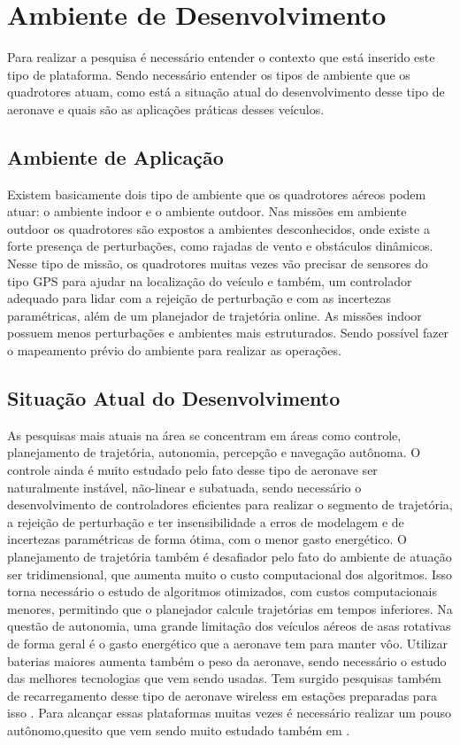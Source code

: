 \chapter{Ambiente de Desenvolvimento}
\label{chap:ambiente}

Para realizar a pesquisa é necessário entender o contexto que está inserido este tipo de plataforma. Sendo necessário entender os tipos de ambiente que os quadrotores atuam, como está a situação atual do desenvolvimento desse tipo de aeronave e quais são as aplicações práticas desses veículos.

\section{Ambiente de Aplicação}

Existem basicamente dois tipo de ambiente que os quadrotores aéreos podem atuar: o ambiente indoor e o ambiente outdoor. Nas missões em ambiente outdoor os quadrotores são expostos a ambientes desconhecidos, onde existe a forte presença de perturbações, como rajadas de vento e obstáculos dinâmicos. Nesse tipo de missão, os quadrotores muitas vezes vão precisar de sensores do tipo GPS para ajudar na localização do veículo e também, um controlador adequado para lidar com a rejeição de perturbação e com as incertezas paramétricas, além de um planejador de trajetória online. As missões indoor possuem menos perturbações e ambientes mais estruturados. Sendo possível fazer o mapeamento prévio do ambiente para realizar as operações.

\section{Situação Atual do Desenvolvimento}

As pesquisas mais atuais na área se concentram em áreas como controle, planejamento de trajetória, autonomia, percepção e navegação autônoma. O controle ainda é muito estudado pelo fato desse tipo de aeronave ser naturalmente instável, não-linear e subatuada, sendo necessário o desenvolvimento de controladores eficientes para realizar o segmento de trajetória, a rejeição de perturbação e ter insensibilidade a erros de modelagem e de incertezas paramétricas de forma ótima, com o menor gasto energético. O planejamento de trajetória também é desafiador pelo fato do ambiente de atuação ser tridimensional, que aumenta muito o custo computacional dos algoritmos. Isso torna necessário o estudo de algoritmos otimizados, com custos computacionais menores, permitindo que o planejador calcule trajetórias em tempos inferiores. Na questão de autonomia, uma grande limitação dos veículos aéreos de asas rotativas de forma geral é o gasto energético que a aeronave tem para manter vôo. Utilizar baterias maiores aumenta também o peso da aeronave, sendo necessário o estudo das melhores tecnologias que vem sendo usadas. Tem surgido pesquisas também de recarregamento desse tipo de aeronave wireless em estações preparadas para isso \cite{Mulgaonkar2014,Sierra2019,Abdilla2015b}. Para alcançar essas plataformas muitas vezes é necessário realizar um pouso autônomo,quesito que vem sendo muito estudado também em \cite{Lim2021,Simon2018,Falanga2017a,Jin2016a,Serra2016a,Kim2016,Ling2014,Serra2014,Herisse2012}.

